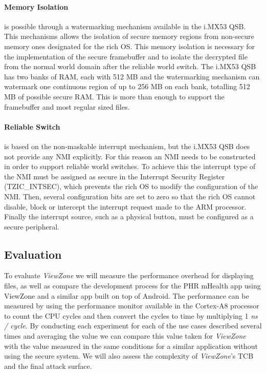 \paragraph{Memory Isolation} is possible through a watermarking mechanism available in the i.MX53 QSB. This mechanisms allows the isolation of secure memory regions from non-secure memory ones designated for the rich OS. This memory isolation is necessary for the implementation of the secure framebuffer and to isolate the decrypted file from the normal world domain after the reliable world switch. The i.MX53 QSB has two banks of RAM, each with 512 MB and the watermarking mechanism can watermark one continuous region of up to 256 MB on each bank, totalling 512 MB of possible secure RAM. This is more than enough to support the framebuffer and most regular sized files.

\paragraph{Reliable Switch} is based on the non-maskable interrupt mechanism, but the i.MX53 QSB does not provide any \ac{NMI} explicitly. For this reason an \ac{NMI} needs to be constructed in order to support reliable world switches. To achieve this the interrupt type of the \ac{NMI} must be assigned as secure in the Interrupt Security Register (TZIC\_INTSEC), which prevents the rich OS to modify the configuration of the \ac{NMI}. Then, several configuration bits are set to zero so that the rich OS cannot disable, block or intercept the interrupt request made to the ARM processor. Finally the interrupt source, such as a physical button, must be configured as a secure peripheral.

\subsection{Evaluation}

To evaluate \emph{ViewZone} we will measure the performance overhead for displaying files, as well as compare the development process for the PHR mHealth app using ViewZone and a similar app built on top of Android. The performance can be measured by using the performance monitor available in the Cortex-A8 processor to count the CPU cycles and then convert the cycles to time by multiplying 1 \emph{ns / cycle}. By conducting each experiment for each of the use cases described several times and averaging the value we can compare this value taken for \emph{ViewZone} with the value measured in the same conditions for a similar application without using the secure system. We will also assess the complexity of \emph{ViewZone}'s TCB and the final attack surface.

